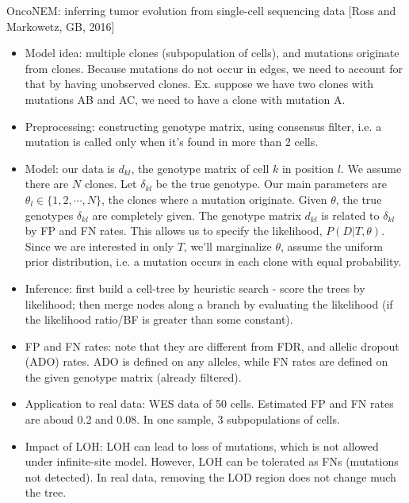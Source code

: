 \documentclass{report}
\begin{document}
OncoNEM: inferring tumor evolution from single-cell sequencing data [Ross and Markowetz, GB, 2016]
\begin{itemize}
	\item Model idea: multiple clones (subpopulation of cells), and mutations originate from clones. Because mutations do not occur in edges, we need to account for that by having unobserved clones. Ex. suppose we have two clones with mutations AB and AC, we need to have a clone with mutation A.  
	
	\item Preprocessing: constructing genotype matrix, using consensus filter, i.e. a mutation is called only when it's found in more than 2 cells. 
	
	\item Model: our data is $d_{kl}$, the genotype matrix of cell $k$ in position $l$. We assume there are $N$ clones. Let $\delta_{kl}$ be the true genotype. Our main parameters are $\theta_l \in \{1, 2, \cdots, N\}$, the clones where a mutation originate. Given $\theta$, the true genotypes $\delta_{kl}$ are completely given. The genotype matrix $d_{kl}$ is related to $\delta_{kl}$ by FP and FN rates. This allows us to specify the likelihood, $P(D|T, \theta)$. Since we are interested in only $T$, we'll marginalize $\theta$, assume the uniform prior distribution, i.e. a mutation occurs in each clone with equal probability. 
	
	\item Inference: first build a cell-tree by heuristic search - score the trees by likelihood; then merge nodes along a branch by evaluating the likelihood (if the likelihood ratio/BF is greater than some constant). 
	
	\item FP and FN rates: note that they are different from FDR, and allelic dropout (ADO) rates. ADO is defined on any alleles, while FN rates are defined on the given genotype matrix (already filtered).  
	
	\item Application to real data: WES data of 50 cells. Estimated FP and FN rates are aboud 0.2 and 0.08. In one sample, 3 subpopulations of cells. 
	
	\item Impact of LOH: LOH can lead to loss of mutations, which is not allowed under infinite-site model. However, LOH can be tolerated as FNs (mutations not detected). In real data, removing the LOD region does not change much the tree. 
\end{itemize}
\end{document}
